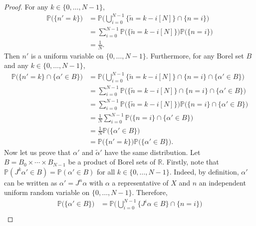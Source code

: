 \documentclass[numbers,compress,v1.0.1]{vmsta}
\theoremstyle{definition}
\begin{document}
\begin{proof}
For any $k\in\lbrace0,\dots,N-1\rbrace$,
%
\begin{align*}
\mathbb{P}\bigl(\bigl\lbrace n'=k\bigr\rbrace\bigr)&=\mathbb{P}
\Biggl(\bigcup_{i=0}^{N-1}\bigl\lbrace
\tilde{n}=k-i[N]\bigr\rbrace\cap\lbrace n=i\rbrace\Biggr)
\\
&=\sum_{i=0}^{N-1}\mathbb{P}\bigl(\bigl
\lbrace\tilde{n}=k-i[N]\bigr\rbrace\bigr)\mathbb {P}\bigl(\lbrace n=i\rbrace\bigr)
\\
&=\frac{1}{N}.
\end{align*}
%
Then $n'$ is a uniform variable on $\lbrace0,\dots,N-1\rbrace$.
Furthermore, for any Borel set $B$ and any $k\in\lbrace0,\dots
,N-1\rbrace$,
%
\begin{align*}
\mathbb{P}\bigl(\bigl\lbrace n'=k\bigr\rbrace\cap\bigl\lbrace
\alpha'\in B\bigr\rbrace\bigr)&=\mathbb {P}\Biggl(\bigcup
_{i=0}^{N-1}\bigl\lbrace\tilde{n}=k-i[N]\bigr\rbrace
\cap\lbrace n=i\rbrace\cap\bigl\lbrace\alpha'\in B\bigr\rbrace
\Biggr)
\\
&=\sum_{i=0}^{N-1}\mathbb{P}\bigl(\bigl
\lbrace\tilde{n}=k-i[N]\bigr\rbrace\cap\lbrace n=i\rbrace\cap\bigl\lbrace
\alpha'\in B\bigr\rbrace\bigr)
\\
&=\sum_{i=0}^{N-1}\mathbb{P}\bigl(\bigl
\lbrace\tilde{n}=k-i[N]\bigr\rbrace\bigr)\mathbb {P}\bigl(\lbrace n=i\rbrace\cap
\bigl\lbrace\alpha'\in B\bigr\rbrace\bigr)
\\
&=\frac{1}{N}\sum_{i=0}^{N-1}
\mathbb{P}\bigl(\lbrace n=i\rbrace\cap\bigl\lbrace \alpha'\in B\bigr
\rbrace\bigr)
\\
&=\frac{1}{N}\mathbb{P}\bigl(\bigl\lbrace\alpha'\in B\bigr
\rbrace\bigr)
\\
&=\mathbb{P}\bigl(\bigl\lbrace n'=k\bigr\rbrace\bigr)\mathbb{P}
\bigl( \bigl\lbrace\alpha'\in B\bigr\rbrace\bigr).
\end{align*}
%
Now let us prove that $\alpha'$ and $\tilde{\alpha}'$ have the same
distribution. Let $B=B_{0}\times\cdots\times B_{N-1}$ be a product of
Borel sets of $\mathbb{R}$. Firstly, note that $\mathbb{P}(J^k\alpha
'\in B)= \mathbb{P}(\alpha'\in B)$ for all $k\in\lbrace0,\dots
,N-1\rbrace$. Indeed, by definition, $\alpha'$ can be written as $
\alpha'=J^n\alpha$ with $\alpha$ a representative of $X$ and $n$ an
independent uniform random variable on $\lbrace0,\dots,N-1\rbrace$. Therefore,
%
\begin{align*}
\mathbb{P}\bigl(\bigl\lbrace\alpha'\in B\bigr\rbrace\bigr)&=
\mathbb{P}\Biggl(\bigcup_{i=0}^{N-1}\bigl
\lbrace J^i\alpha\in B\bigr\rbrace\cap\lbrace n=i\rbrace\Biggr)
\\

\end{align*}
\end{proof}
\end{document}
